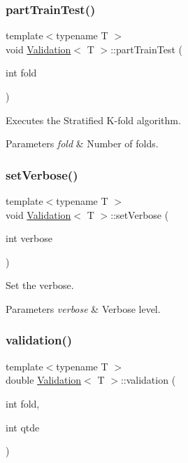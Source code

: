 \subsubsection{\texorpdfstring{part\+Train\+Test()}{partTrainTest()}}
{\footnotesize\ttfamily template$<$typename T $>$ \\
void \hyperlink{class_validation}{Validation}$<$ T $>$\+::part\+Train\+Test (\begin{DoxyParamCaption}\item[{int}]{fold }\end{DoxyParamCaption})}



Executes the Stratified K-\/fold algorithm. 


\begin{DoxyParams}{Parameters}
{\em fold} & Number of folds. \\
\hline
\end{DoxyParams}
\mbox{\label{class_validation_adddf2e9eb960b7636e6615ecbd9783bb}} 
\subsubsection{\texorpdfstring{set\+Verbose()}{setVerbose()}}
{\footnotesize\ttfamily template$<$typename T $>$ \\
void \hyperlink{class_validation}{Validation}$<$ T $>$\+::set\+Verbose (\begin{DoxyParamCaption}\item[{int}]{verbose }\end{DoxyParamCaption})\hspace{0.3cm}{\ttfamily [inline]}}



Set the verbose. 


\begin{DoxyParams}{Parameters}
{\em verbose} & Verbose level. \\
\hline
\end{DoxyParams}
\mbox{\label{class_validation_a94a4eef1571e6e2665d7e8d5df7b20c6}} 
\subsubsection{\texorpdfstring{validation()}{validation()}}
{\footnotesize\ttfamily template$<$typename T $>$ \\
double \hyperlink{class_validation}{Validation}$<$ T $>$\+::validation (\begin{DoxyParamCaption}\item[{int}]{fold,  }\item[{int}]{qtde }\end{DoxyParamCaption})}



